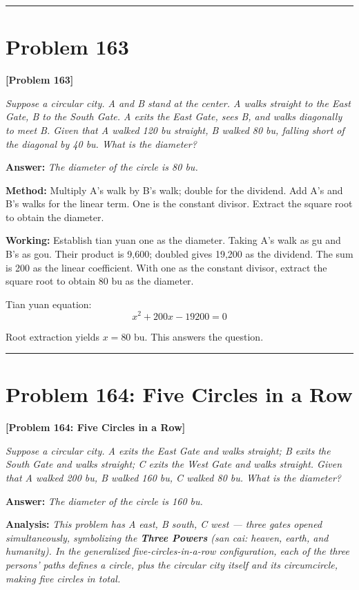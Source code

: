 \documentclass[11pt,a4paper]{book}
\newcommand{\answer}[1]{\noindent\textbf{\color{anacolor}Answer: }\textit{#1}\par}
\newcommand{\method}[1]{\noindent\textbf{\color{methodcolor}Method: }#1\par}
\newcommand{\working}[1]{\noindent\textbf{\color{workcolor}Working: }#1\par}
\newcommand{\analysis}[1]{\noindent\textbf{\color{anacolor}Analysis: }\textit{#1}\par}
\newcommand{\shortline}{\noindent\rule{0.5\textwidth}{0.4pt}\par}
\begin{document}
\shortline

\section{Problem 163}
\label{sec:prob163}

\noindent\textbf{\color{probcolor}[Problem 163]}

\textit{Suppose a circular city. A and B stand at the center. A walks straight to the East Gate, B to the South Gate. A exits the East Gate, sees B, and walks diagonally to meet B. Given that A walked 120 bu straight, B walked 80 bu, falling short of the diagonal by 40 bu. What is the diameter?}

\answer{The diameter of the circle is 80 bu.}

\method{Multiply A's walk by B's walk; double for the dividend. Add A's and B's walks for the linear term. One is the constant divisor. Extract the square root to obtain the diameter.}

\working{Establish tian yuan one as the diameter. Taking A's walk as gu and B's as gou. Their product is 9,600; doubled gives 19,200 as the dividend. The sum is 200 as the linear coefficient. With one as the constant divisor, extract the square root to obtain 80 bu as the diameter.

Tian yuan equation:
$$x^2 + 200x - 19200 = 0$$

Root extraction yields $x = 80$ bu. This answers the question.}

\shortline

\section{Problem 164: Five Circles in a Row}
\label{sec:prob164}

\noindent\textbf{\color{probcolor}[Problem 164: Five Circles in a Row]}

\textit{Suppose a circular city. A exits the East Gate and walks straight; B exits the South Gate and walks straight; C exits the West Gate and walks straight. Given that A walked 200 bu, B walked 160 bu, C walked 80 bu. What is the diameter?}

\answer{The diameter of the circle is 160 bu.}

\analysis{This problem has A east, B south, C west --- three gates opened simultaneously, symbolizing the \textbf{Three Powers} (\textit{san cai}: heaven, earth, and humanity). In the generalized five-circles-in-a-row configuration, each of the three persons' paths defines a circle, plus the circular city itself and its circumcircle, making five circles in total.}
\end{document}
